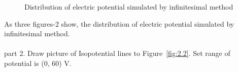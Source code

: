 \documentclass[10pt, journal, final]{IEEEtran}
\begin{document}
\begin{figure}[htbp]
    \centering

    \caption{Distribution of electric potential simulated by infinitesimal method}
    \label{fig:2.1}
\end{figure}
As three figures-2 show, the distribution of electric potential simulated by infinitesimal method.\\
\\
part 2. Draw picture of Isopotential lines to Figure~\ref{fig:2.2}.
Set range of potential is (0, 60) V.

\end{document}
